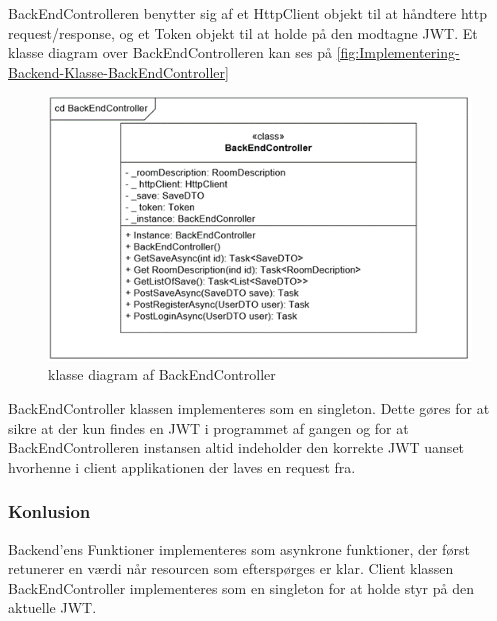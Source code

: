 BackEndControlleren benytter sig af et HttpClient objekt til at håndtere http request/response, og et Token objekt til at holde på den modtagne JWT.
Et klasse diagram over BackEndControlleren kan ses på \autoref{fig:Implementering-Backend-Klasse-BackEndController}\\

\begin{figure}[H]
\centering
\includegraphics[width = \textwidth]{02-Body/Images/Backend_klasse_BackEndController.PNG}
\caption{klasse diagram af BackEndController}
\label{fig:Implementering-Backend-Klasse-BackEndController}
\end{figure}

BackEndController klassen implementeres som en singleton. Dette gøres for at sikre at der kun findes en JWT i programmet af gangen og for at BackEndControlleren instansen altid indeholder den korrekte JWT uanset hvorhenne i client applikationen der laves en request fra.\\


\subsubsection{Konlusion}

Backend'ens Funktioner implementeres som asynkrone funktioner, der først retunerer en værdi når resourcen som efterspørges er klar. Client klassen BackEndController implementeres som en singleton for at holde styr på den aktuelle JWT.

\newpage
